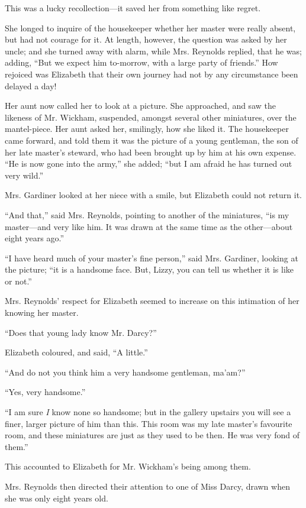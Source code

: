 \documentclass[12pt,openright]{book}
\begin{document}
This was a lucky recollection—it saved her from something like regret.

She longed to inquire of the housekeeper whether her master were really absent, but had not courage for it. At length, however, the question was asked by her uncle; and she turned away with alarm, while Mrs. Reynolds replied, that he was; adding, “But we expect him to-morrow, with a large party of friends.” How rejoiced was Elizabeth that their own journey had not by any circumstance been delayed a day!

Her aunt now called her to look at a picture. She approached, and saw the likeness of Mr. Wickham, suspended, amongst several other miniatures, over the mantel-piece. Her aunt asked her, smilingly, how she liked it. The housekeeper came forward, and told them it was the picture of a young gentleman, the son of her late master’s steward, who had been brought up by him at his own expense. “He is now gone into the army,” she added; “but I am afraid he has turned out very wild.”

Mrs. Gardiner looked at her niece with a smile, but Elizabeth could not return it.

“And that,” said Mrs. Reynolds, pointing to another of the miniatures, “is my master—and very like him. It was drawn at the same time as the other—about eight years ago.”

“I have heard much of your master’s fine person,” said Mrs. Gardiner, looking at the picture; “it is a handsome face. But, Lizzy, you can tell us whether it is like or not.”

Mrs. Reynolds’ respect for Elizabeth seemed to increase on this intimation of her knowing her master.

“Does that young lady know Mr. Darcy?”

Elizabeth coloured, and said, “A little.”

“And do not you think him a very handsome gentleman, ma’am?”

“Yes, very handsome.”

“I am sure \textit{I} know none so handsome; but in the gallery upstairs you will see a finer, larger picture of him than this. This room was my late master’s favourite room, and these miniatures are just as they used to be then. He was very fond of them.”

This accounted to Elizabeth for Mr. Wickham’s being among them.

Mrs. Reynolds then directed their attention to one of Miss Darcy, drawn when she was only eight years old.
\end{document}
